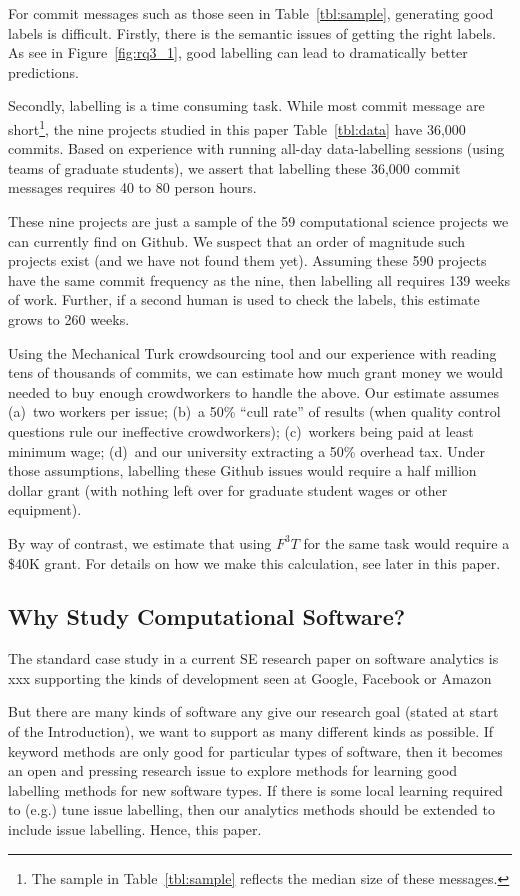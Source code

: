 \documentclass[10pt,conference]{IEEEtran}
\newcommand{\fig}[1]{Figure~\ref{fig:#1}}
\newcommand{\tbl}[1]{Table~\ref{tbl:#1}}
\begin{document}
For commit messages such as those seen in \tbl{sample},
generating good labels is difficult. Firstly, there is the semantic issues
of getting the right labels. As see in \fig{rq3_1}, good labelling can lead to dramatically better   predictions.

Secondly, labelling is a time consuming task. While most commit message are short\footnote{The sample  in \tbl{sample} reflects the median size of these messages.},
the   nine projects studied in this paper \tbl{data} have 36,000 commits.
Based on experience
with running all-day data-labelling sessions (using  teams of graduate students),
we assert that labelling these  36,000 commit messages
requires 40 to 80 person hours.  

These nine projects are just a sample of the 59 computational science projects we can currently find on Github. We suspect that an order of magnitude
such projects exist (and we have not found them yet).
Assuming these 590 projects have  the same commit frequency as the nine,
then labelling all requires  139 weeks of work.
Further,  if a second human 
is used to check the labels,  this estimate grows to 260 weeks. 

Using the Mechanical Turk crowdsourcing tool and our experience
with reading tens of thousands of commits, we can estimate  how much grant
money we would needed to   buy
enough crowdworkers to handle the above. Our estimate assumes
(a)~two workers per issue; (b)~a 50\% ``cull rate'' of results (when quality control
questions rule our ineffective crowdworkers);   (c)~workers being paid at least
minimum wage; (d)~and our university extracting a 50\% overhead tax.
Under those assumptions, labelling these Github issues would
require a half million dollar grant (with nothing left over
for graduate student wages or other equipment). 

By way
of contrast, we estimate that using $F^3T$ for the same
task would require a \$40K grant.  For details on how we make this
calculation, see later in this paper.

\subsection{Why Study Computational Software?}

The standard case study in a current SE research paper on software analytics is xxx supporting the kinds of development seen at Google, Facebook or Amazon

But there are many kinds of software any give our research goal (stated at start of the Introduction),
we want to support as many different kinds as possible.
If   keyword methods are only good for particular types of software,
then it becomes an open and pressing research issue to explore methods
for learning good labelling methods for new software types. 
If there is some local learning required to (e.g.) tune   issue labelling,
then our analytics methods should be extended to include issue labelling. Hence, this paper.
\end{document}

